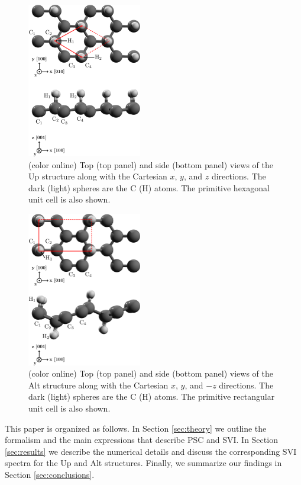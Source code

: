 \documentclass[floatfix,prb,aps,superscriptaddress,showpacs,11pt,preprint,letterpaper]{revtex4}
\begin{document}
\begin{figure}[ht!]
    \centering
    \includegraphics[width=5cm]{fig1}
    \caption{(color online) Top (top panel) and side (bottom panel) views of
the Up structure along with the Cartesian $x$, $y$, and $z$ directions. The
dark (light) spheres are the C (H) atoms. The primitive hexagonal unit cell is
also shown.}
    \label{fig:up-struc}
\end{figure}
\begin{figure}[ht!]
    \centering
    \includegraphics[width=5cm]{fig2}
    \caption{(color online) Top (top panel) and side (bottom panel) views of
the Alt structure along with the Cartesian $x$, $y$, and $-z$ directions. The
dark (light) spheres are the C (H) atoms. The primitive rectangular unit cell
is also shown. }
    \label{fig:alt-struc}
\end{figure}

This paper is organized as follows. In Section \ref{sec:theory} we outline the
formalism and the main expressions  that describe PSC and SVI. In Section
\ref{sec:results} we describe the numerical details  and  discuss the
corresponding SVI spectra for the Up and Alt structures. Finally, we summarize
our findings in Section \ref{sec:conclusions}.
\end{document}
